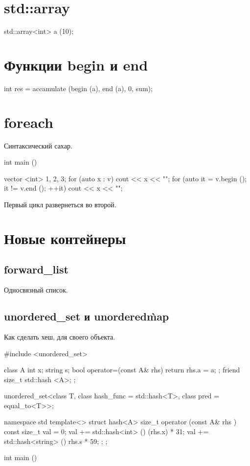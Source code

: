 \section{std::array}
\begin{cppcode}
std::array<int> a (10);
\end{cppcode}

\section{Функции begin и end}
\begin{cppcode}
int res = accamulate (begin (a), end (a), 0, sum);
\end{cppcode}

\section{foreach}
Синтаксический сахар.

\begin{cppcode}
int main () {
  vector <int> {1, 2, 3};
  for (auto x : v) {
    cout << x << "\n";
  }
  for (auto it = v.begin (); it != v.end (); ++it) {
   cout << x << "\n"; 
  }

}
\end{cppcode}

Первый цикл развернеться во второй.

\section{Новые контейнеры}

\subsection{forward\_list}
Односвязный список.

\subsection{unordered\_set и unordered\`map}
Как сделать хеш, для своего объекта. 
\begin{cppcode}

#include <unordered_set>

class A {
  int x;
  string s;
  bool operator=(const A& rhs) {
    return rhs.a = a;
  };
  friend size_t std::hash <A>;
};

unordered_set<class T, class hash_func = std::hash<T>, class pred = equal_to<T>>;

namespace std {
  template<>
  struct hash<A> {
    size_t operator (const A& rhs ) const {
      size_t val = 0;
      val += std::hash<int> () (rhs.x) * 31;
      val += std::hash<string> () rhs.s * 59;
    }
  };
};

int main () {


}
\end{cppcode}


\subsection{}





